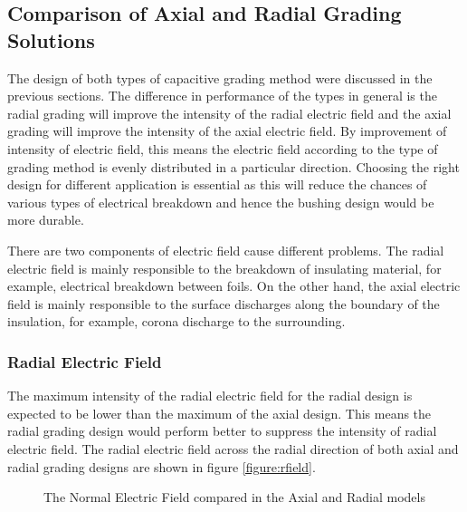 \subsection{Comparison of Axial and Radial Grading Solutions}
The design of both types of capacitive grading method were discussed in the previous sections. The difference in performance of the types in general is the radial grading will improve the intensity of the radial electric field and the axial grading will improve the intensity of the axial electric field. By improvement of intensity of electric field, this means the electric field according to the type of grading method is evenly distributed in a particular direction. Choosing the right design for different application is essential as this will reduce the chances of various types of electrical breakdown and hence the bushing design would be more durable.

There are two components of electric field cause different problems. The radial electric field is mainly responsible to the breakdown of insulating material, for example, electrical breakdown between foils. On the other hand, the axial electric field is mainly responsible to the surface discharges along the boundary of the insulation, for example, corona discharge to the surrounding.

\subsubsection{Radial Electric Field}
The maximum intensity of the radial electric field for the radial design is expected to be lower than the maximum of the axial design. This means the radial grading design would perform better to suppress the intensity of radial electric field. The radial electric field across the radial direction of both axial and radial grading designs are shown in figure \ref{figure:rfield}.

\begin{figure}[!h]
  \centering
{} 
\caption{The Normal Electric Field compared in the Axial and Radial models}
\label{Figure:No_Grad_Failing}
\end{figure}


